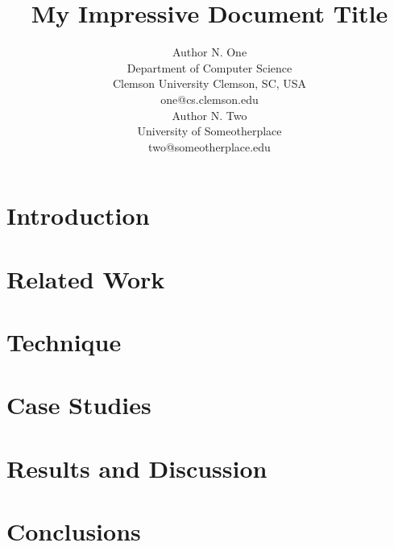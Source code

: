 \documentclass[times, 10pt, twocolumn]{article}
\title{My Impressive Document Title}
\author{Author N. One\\
    Department of Computer Science\\
    Clemson University
    Clemson, SC, USA\\
    {\small one@cs.clemson.edu}\\
    Author N. Two\\
    University of Someotherplace\\
    {\small two@someotherplace.edu}\\
}
\begin{document}
\maketitle

\begin{abstract}
\end{abstract}

\section{Introduction}
    \label{sec:intro}
    
\section{Related Work}
\section{Technique}
\section{Case Studies}
\section{Results and Discussion}
\section{Conclusions}
\end{document}
